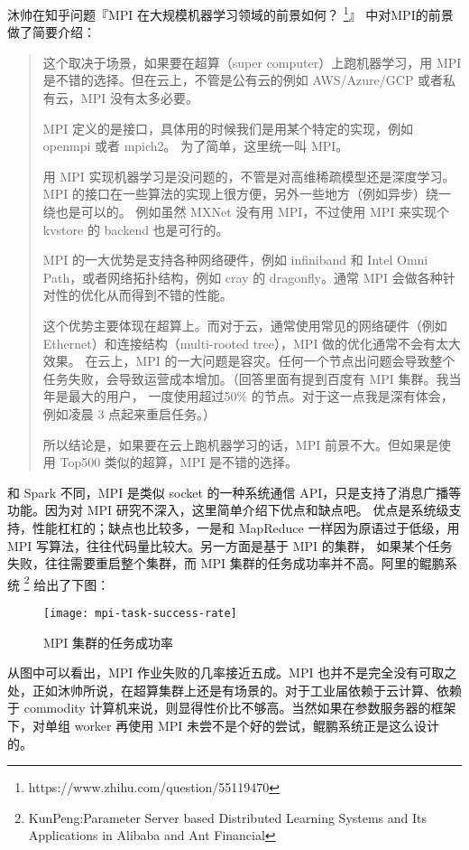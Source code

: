 沐帅在知乎问题『MPI 在大规模机器学习领域的前景如何？%
\footnote{https://www.zhihu.com/question/55119470}』%
中对MPI的前景做了简要介绍：
\begin{quotation}
这个取决于场景，如果要在超算（super computer）上跑机器学习，用 MPI 是不错的选择。但在云上，不管是公有云的例如 AWS/Azure/GCP 或者私有云，MPI
没有太多必要。

MPI 定义的是接口，具体用的时候我们是用某个特定的实现，例如 openmpi 或者 mpich2。 为了简单，这里统一叫 MPI。

用  MPI 实现机器学习是没问题的，不管是对高维稀疏模型还是深度学习。MPI 的接口在一些算法的实现上很方便，另外一些地方（例如异步）绕一绕也是可以的。
例如虽然 MXNet 没有用 MPI，不过使用 MPI 来实现个 kvstore 的 backend 也是可行的。

MPI 的一大优势是支持各种网络硬件，例如 infiniband 和 Intel Omni Path，或者网络拓扑结构，例如 cray 的 dragonfly。通常 MPI 会做各种针对性的优化从而得到不错的性能。

这个优势主要体现在超算上。而对于云，通常使用常见的网络硬件（例如Ethernet）和连接结构（multi-rooted tree），MPI 做的优化通常不会有太大效果。
在云上，MPI 的一大问题是容灾。任何一个节点出问题会导致整个任务失败，会导致运营成本增加。（回答里面有提到百度有 MPI 集群。我当年是最大的用户，
一度使用超过50\% 的节点。对于这一点我是深有体会，例如凌晨 3 点起来重启任务。）

所以结论是，如果要在云上跑机器学习的话，MPI 前景不大。但如果是使用 Top500 类似的超算，MPI 是不错的选择。
\end{quotation}

和 Spark 不同，MPI 是类似 socket 的一种系统通信 API，只是支持了消息广播等功能。因为对 MPI 研究不深入，这里简单介绍下优点和缺点吧。
优点是系统级支持，性能杠杠的；缺点也比较多，一是和 MapReduce 一样因为原语过于低级，用 MPI 写算法，往往代码量比较大。另一方面是基于 MPI 的集群，
如果某个任务失败，往往需要重启整个集群，而 MPI 集群的任务成功率并不高。阿里的鲲鹏系统%
\footnote{KunPeng:Parameter Server based Distributed Learning Systems and Its Applications in
Alibaba and Ant Financial}%
给出了下图：

\begin{figure}[hbtp]
\centering
\texttt{[image: mpi-task-success-rate]}
\caption{MPI 集群的任务成功率}
\end{figure}

从图中可以看出，MPI 作业失败的几率接近五成。MPI 也并不是完全没有可取之处，正如沐帅所说，在超算集群上还是有场景的。对于工业届依赖于云计算、依赖于
commodity 计算机来说，则显得性价比不够高。当然如果在参数服务器的框架下，对单组 worker 再使用 MPI 未尝不是个好的尝试，鲲鹏系统正是这么设计的。

